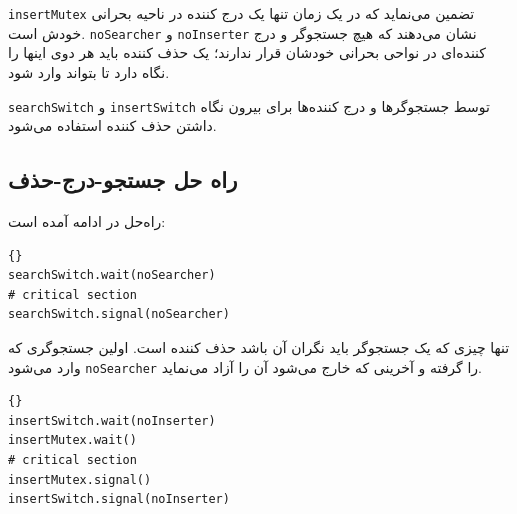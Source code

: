 \documentclass{book}
\newcommand{\clearemptydoublepage}{\newpage\cleardoublepage}
\begin{document}
    {\tt insertMutex}
     تضمین می‌نماید که در یک زمان تنها یک درج کننده در ناحیه بحرانی خودش است. 
      {\tt noSearcher} و {\tt noInserter} 
    نشان می‌دهند که هیچ جستجوگر و درج کننده‌ای در نواحی بحرانی خودشان قرار ندارند؛ یک حذف کننده باید هر دوی 
    اینها را نگاه دارد تا بتواند وارد شود. 

{\tt searchSwitch} و {\tt insertSwitch} 
 توسط جستجوگرها و درج‌ کننده‌ها برای بیرون نگاه داشتن حذف کننده استفاده می‌شود. 


\clearemptydoublepage
\subsection{راه حل جستجو-درج-حذف}

    راه‌حل در ادامه آمده است: 

\begin{latin}
\begin{lstlisting}[title={راه حل جستجو-درج-حذف (جستجوگر)}]{}
searchSwitch.wait(noSearcher)
# critical section
searchSwitch.signal(noSearcher)
\end{lstlisting}
\end{latin}

    تنها چیزی که یک جستجوگر باید نگران آن باشد حذف کننده است. 
    اولین جستجوگری که وارد می‌شود {\tt noSearcher} را گرفته و آخرینی که خارج می‌شود آن را آزاد می‌نماید. 

\begin{latin}
\begin{lstlisting}[title={راه حل جستجو-درج-حذف (درج‌کننده)}]{}
insertSwitch.wait(noInserter)
insertMutex.wait()
# critical section
insertMutex.signal()
insertSwitch.signal(noInserter)
\end{lstlisting}
\end{latin}
\end{document}
